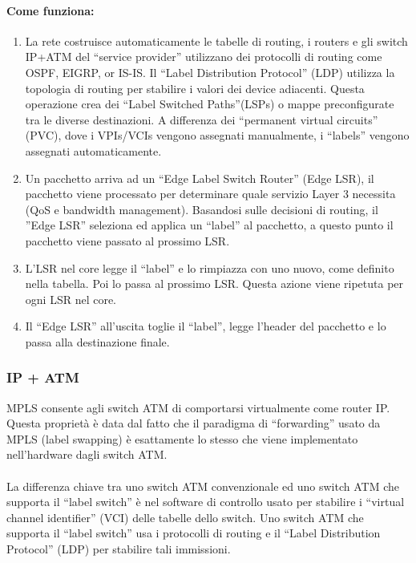 \documentclass[8pt]{extarticle}
\begin{document}
\paragraph{Come funziona:}
\noindent
\begin{enumerate}
    \item La rete costruisce automaticamente le tabelle di routing, i routers e gli switch IP+ATM del 
    “service provider” utilizzano dei protocolli di routing come OSPF, EIGRP, or IS-IS. Il “Label 
    Distribution Protocol” (LDP) utilizza la topologia di routing per stabilire i valori dei device 
    adiacenti. Questa operazione crea dei “Label Switched Paths”(LSPs) o mappe  preconfigurate tra le 
    diverse destinazioni. A differenza dei “permanent virtual circuits” (PVC), dove i VPIs/VCIs vengono 
    assegnati manualmente, i “labels” vengono assegnati automaticamente. 
    \item Un pacchetto arriva ad un “Edge Label Switch Router” (Edge LSR), il pacchetto viene processato 
    per determinare quale servizio Layer 3 necessita (QoS e bandwidth management). Basandosi sulle 
    decisioni di routing, il ”Edge LSR” seleziona ed applica un “label” al pacchetto, a questo punto 
    il pacchetto viene passato al prossimo LSR. 
    \item L’LSR nel core legge il “label” e lo rimpiazza con uno nuovo, come definito nella tabella. 
    Poi lo passa al prossimo LSR. Questa azione viene ripetuta per ogni LSR nel core.
    \item Il “Edge LSR” all’uscita toglie il “label”, legge l’header del pacchetto e lo passa 
    alla destinazione finale. 
\end{enumerate}
\subsubsection{IP + ATM}
MPLS consente agli switch ATM di comportarsi virtualmente come router IP. Questa proprietà è data dal fatto 
che il paradigma di “forwarding” usato da MPLS (label swapping) è esattamente lo stesso che viene 
implementato nell’hardware dagli switch ATM.\\\\
La differenza chiave tra uno switch ATM convenzionale ed uno switch ATM che supporta il “label switch” è 
nel software di controllo usato per stabilire i “virtual channel identifier” (VCI) delle tabelle dello 
switch. Uno switch ATM che supporta il “label switch” usa i protocolli di routing e il “Label Distribution 
Protocol” (LDP) per stabilire tali immissioni. 
\end{document}

